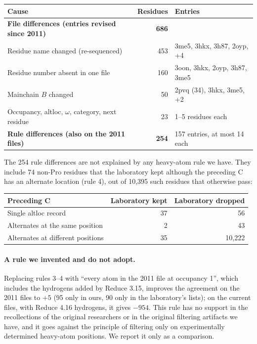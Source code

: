 \documentclass[11pt]{article}
\begin{document}
\begin{center}
\begin{tabular}{lrl}
  \toprule
  Cause & Residues & Entries \\
  \midrule
  \textbf{File differences (entries revised since 2011)} & \textbf{686} & \\
  \quad Residue name changed (re-sequenced) & 453 & 3me5, 3hkx, 3h87, 2oyp, +4 \\
  \quad Residue number absent in one file & 160 & 3oon, 3hkx, 2oyp, 3h87, 3me5 \\
  \quad Mainchain $B$ changed & 50 & 2pvq (34), 3hkx, 3me5, +2 \\
  \quad Occupancy, altloc, $\omega$, category, next residue & 23 & 1--5 residues each \\
  \textbf{Rule differences (also on the 2011 files)} & \textbf{254} & 157 entries, at most 14 each \\
  \bottomrule
\end{tabular}
\end{center}

The 254 rule differences are not explained by any heavy-atom rule we have. They include 74 non-Pro
residues that the laboratory kept although the preceding C has an alternate location (rule 4),
out of 10,395 such residues that otherwise pass:

\begin{center}
\begin{tabular}{lrr}
  \toprule
  Preceding C & Laboratory kept & Laboratory dropped \\
  \midrule
  Single altloc record & 37 & 56 \\
  Alternates at the same position & 2 & 43 \\
  Alternates at different positions & 35 & 10,222 \\
  \bottomrule
\end{tabular}
\end{center}

\paragraph{A rule we invented and do not adopt.} Replacing rules 3--4 with ``every atom in the
2011 file at occupancy 1'', which includes the hydrogens added by Reduce 3.15, improves the
agreement on the 2011 files to $+5$ (95 only in ours, 90 only in the laboratory's lists); on the
current files, with Reduce 4.16 hydrogens, it gives $-954$. This rule has no support in the
recollections of the original researchers or in the original filtering artifacts we have, and it
goes against the principle of filtering only on experimentally determined heavy-atom positions.
We report it only as a comparison.
\end{document}
